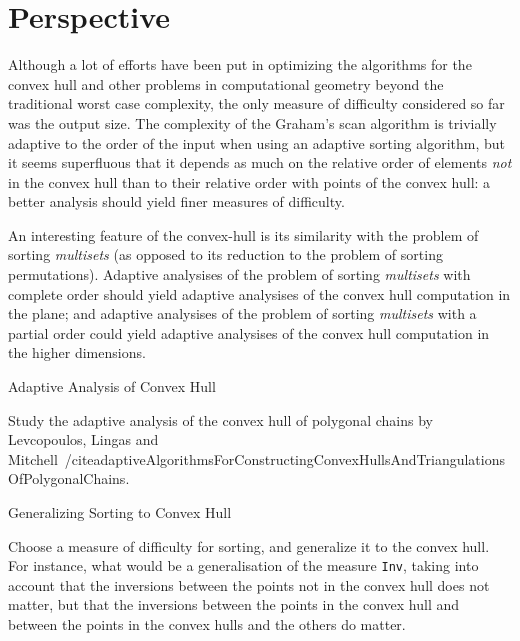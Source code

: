 \section{Perspective}
\label{sec:perspective}

Although a lot of efforts have been put in optimizing the algorithms
for the convex hull and other problems in computational geometry
beyond the traditional worst case complexity, the only measure of
difficulty considered so far was the output size.
%
The complexity of the Graham's scan algorithm is trivially adaptive to
the order of the input when using an adaptive sorting algorithm, but
it seems superfluous that it depends as much on the relative order of
elements \emph{not} in the convex hull than to their relative order
with points of the convex hull: a better analysis should yield finer
measures of difficulty.

An interesting feature of the convex-hull is its similarity with the
problem of sorting \emph{multisets} (as opposed to its reduction to
the problem of sorting permutations). 
%
Adaptive analysises of the problem of sorting \emph{multisets} with
complete order should yield adaptive analysises of the convex hull
computation in the plane; and adaptive analysises of the problem of
sorting \emph{multisets} with a partial order could yield adaptive
analysises of the convex hull computation in the higher dimensions.

\begin{homework}
  \caption{Adaptive Analysis of Convex Hull}    
  Study the adaptive analysis of the convex hull of polygonal chains
  by Levcopoulos, Lingas and
  Mitchell~/cite{adaptiveAlgorithmsForConstructingConvexHullsAndTriangulationsOfPolygonalChains}.
\end{homework}


\begin{openproblem}
  \caption{Generalizing Sorting to Convex Hull}
  Choose a measure of difficulty for sorting, and generalize it to the
  convex hull. For instance, what would be a generalisation of the
  measure \texttt{Inv}, taking into account that the inversions
  between the points not in the convex hull does not matter, but that
  the inversions between the points in the convex hull and between the
  points in the convex hulls and the others do matter.
\end{openproblem}


